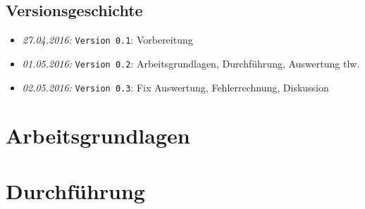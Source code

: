\documentclass{fhnwreport/fhnwreport}
\begin{document}


\clearpage
\pagestyle{empty}
{
    \renewcommand{\thispagestyle}[1]{}



    \clearpage
    \tableofcontents
    \vspace{5mm}
    \subsection*{Versionsgeschichte}
    \begin{itemize}
        \item[]
            \emph{27.04.2016:} \texttt{Version 0.1}: Vorbereitung
        \item[]
            \emph{01.05.2016:} \texttt{Version 0.2}: Arbeitsgrundlagen, Durchf\"uhrung, Auswertung tlw.
        \item[]
            \emph{02.05.2016:} \texttt{Version 0.3}: Fix Auswertung, Fehlerrechnung, Diskussion
    \end{itemize}
}

\clearpage
\setcounter{page}{1}
\pagestyle{headings}


\clearpage
\section{Arbeitsgrundlagen}
\label{sec:arbeitsgrundlagen}



\clearpage
\section{Durchf\"uhrung}
\label{sec:durchfuehrung}

\end{document}
